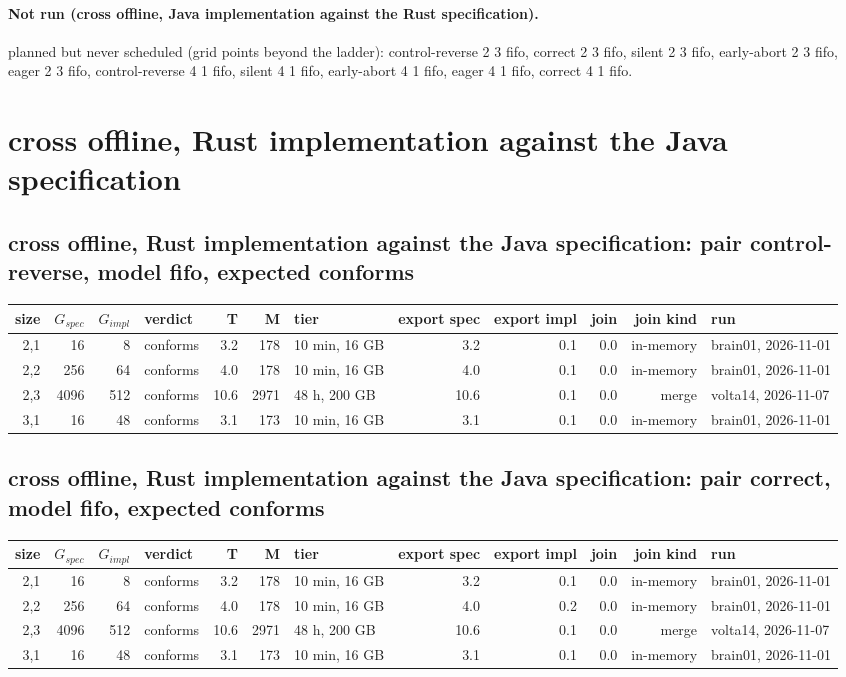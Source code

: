 \documentclass[10pt]{article}
\begin{document}
\paragraph{Not run (cross offline, Java implementation against the Rust specification).}
planned but never scheduled (grid points beyond the ladder): control-reverse 2 3 fifo, correct 2 3 fifo, silent 2 3 fifo, early-abort 2 3 fifo, eager 2 3 fifo, control-reverse 4 1 fifo, silent 4 1 fifo, early-abort 4 1 fifo, eager 4 1 fifo, correct 4 1 fifo.\par
\section*{cross offline, Rust implementation against the Java specification}
\subsection*{cross offline, Rust implementation against the Java specification: pair \textsf{control-reverse}, model fifo, expected conforms}
\begin{longtable}{@{}rrrlrrlrrrrl@{}}
\toprule
size & $G_{\mathit{spec}}$ & $G_{\mathit{impl}}$ & verdict & T & M & tier & export spec & export impl & join & join kind & run \\
\midrule
\endhead
\color{red} 2,1 & 16 & 8 & conforms & 3.2 & 178 & 10 min, 16 GB & 3.2 & 0.1 & 0.0 & in-memory & brain01, 2026-11-01 \\
\color{red} 2,2 & 256 & 64 & conforms & 4.0 & 178 & 10 min, 16 GB & 4.0 & 0.1 & 0.0 & in-memory & brain01, 2026-11-01 \\
\color{red} 2,3 & 4096 & 512 & conforms & 10.6 & 2971 & 48 h, 200 GB & 10.6 & 0.1 & 0.0 & merge & volta14, 2026-11-07 \\
\color{red} 3,1 & 16 & 48 & conforms & 3.1 & 173 & 10 min, 16 GB & 3.1 & 0.1 & 0.0 & in-memory & brain01, 2026-11-01 \\
\bottomrule
\end{longtable}
\subsection*{cross offline, Rust implementation against the Java specification: pair \textsf{correct}, model fifo, expected conforms}
\begin{longtable}{@{}rrrlrrlrrrrl@{}}
\toprule
size & $G_{\mathit{spec}}$ & $G_{\mathit{impl}}$ & verdict & T & M & tier & export spec & export impl & join & join kind & run \\
\midrule
\endhead
\color{red} 2,1 & 16 & 8 & conforms & 3.2 & 178 & 10 min, 16 GB & 3.2 & 0.1 & 0.0 & in-memory & brain01, 2026-11-01 \\
\color{red} 2,2 & 256 & 64 & conforms & 4.0 & 178 & 10 min, 16 GB & 4.0 & 0.2 & 0.0 & in-memory & brain01, 2026-11-01 \\
\color{red} 2,3 & 4096 & 512 & conforms & 10.6 & 2971 & 48 h, 200 GB & 10.6 & 0.1 & 0.0 & merge & volta14, 2026-11-07 \\
\color{red} 3,1 & 16 & 48 & conforms & 3.1 & 173 & 10 min, 16 GB & 3.1 & 0.1 & 0.0 & in-memory & brain01, 2026-11-01 \\
\bottomrule
\end{longtable}
\end{document}
